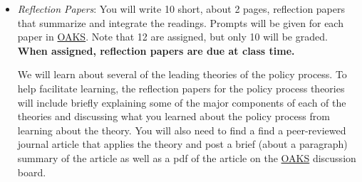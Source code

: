 \begin{itemize}
\item
  \emph{Reflection Papers}: You will write 10 short, about 2 pages,
  reflection papers that summarize and integrate the readings. Prompts
  will be given for each paper in \href{https://lms.cofc.edu}{OAKS}.
  Note that 12 are assigned, but only 10 will be graded. \textbf{When
  assigned, reflection papers are due at class time.}

  \vspace{0.10in} \noindent We will learn about several of the leading
  theories of the policy process. To help facilitate learning, the
  reflection papers for the policy process theories will include briefly
  explaining some of the major components of each of the theories and
  discussing what you learned about the policy process from learning
  about the theory. You will also need to find a find a peer-reviewed
  journal article that applies the theory and post a brief (about a
  paragraph) summary of the article as well as a pdf of the article on
  the \href{https://lms.cofc.edu}{OAKS} discussion board.
\end{itemize}

